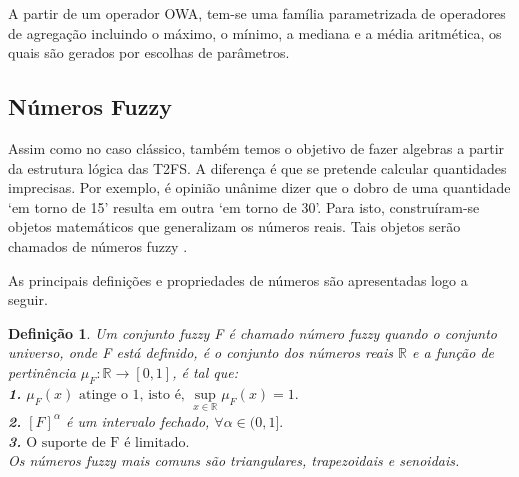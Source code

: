 \documentclass[tcc,capa]{texufpel}
\newtheorem{Def}{Defini\c c\~ao}
\begin{document}
A partir de um operador OWA, tem-se uma família parametrizada de operadores de agregação incluindo o máximo, o mínimo, a mediana e a média aritmética, os quais são gerados por escolhas de parâmetros.

\subsection{Números Fuzzy}
Assim como no caso clássico, também temos o objetivo de fazer algebras a partir da estrutura lógica das T2FS. A diferença é que se pretende calcular quantidades imprecisas. Por exemplo, é opinião unânime dizer que o dobro de uma quantidade `em torno de 15' resulta em outra `em torno de 30'. Para isto, construíram-se objetos matemáticos que generalizam os números reais. Tais objetos serão chamados de números fuzzy \cite{george2008fuzzy}.

As principais definições e propriedades de números são apresentadas logo a seguir.

\begin{Def}
Um conjunto fuzzy F é chamado número fuzzy quando o conjunto universo, onde F está definido, é o conjunto dos números reais $\mathbb{R}$ e a função de pertinência $\mu_{F} : \mathbb{R} \longrightarrow [0,1]$, é tal que: \\

\textbf{1.} $\mu_{F}(x) \mbox{ atinge o 1, isto é, } \sup\limits_{x\in\mathbb{R}} \mu_{F}(x)=1.$ \\


\textbf{2.} $[F]^{\alpha}$ é um intervalo fechado, $\forall \alpha \in (0,1].$ \\

\textbf{3.} $\mbox{O suporte de F é limitado.}$ \\

Os números fuzzy mais comuns são triangulares, trapezoidais e senoidais.

\end{Def}
\end{document}
